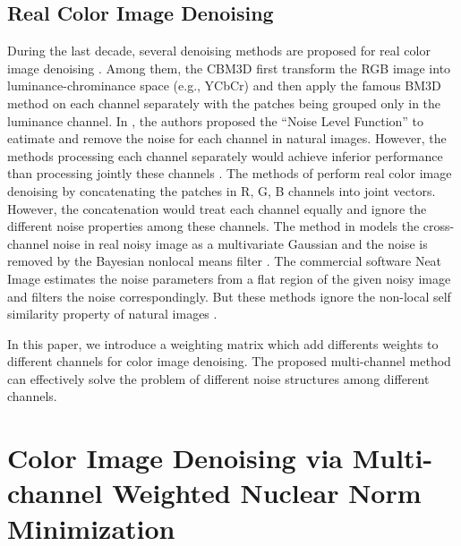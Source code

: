 \documentclass[10pt,twocolumn,letterpaper,sort&compress]{article}
\begin{document}
\subsection{Real Color Image Denoising}
During the last decade, several denoising methods are proposed for real color image denoising \cite{cbm3d,Liu2008,Zhu_2016_CVPR,noiseclinic}. Among them, the CBM3D \cite{cbm3d} first transform the RGB image into luminance-chrominance space (e.g., YCbCr) and then apply the famous BM3D method \cite{bm3d} on each channel separately with the patches being grouped only in the luminance channel. In \cite{Liu2008}, the authors proposed the ``Noise Level Function'' to eatimate and remove the noise for each channel in natural images. However, the methods processing each channel separately would achieve inferior performance than processing jointly these channels \cite{mairal2008sparse}. The methods of \cite{noiseclinic,ncwebsite,Zhu_2016_CVPR} perform real color image denoising by concatenating the patches in R, G, B channels into joint vectors. However, the concatenation would treat each channel equally and ignore the different noise properties among these channels. The method in \cite{crosschannel2016} models the cross-channel noise in real noisy image as a multivariate Gaussian and the noise is removed by the Bayesian nonlocal means filter \cite{kervrann2007bayesian}. The commercial software Neat Image \cite{neatimage} estimates the noise parameters from a flat region of the given noisy image and filters the noise correspondingly. But these methods \cite{crosschannel2016,neatimage} ignore the non-local self similarity property of natural images \cite{bm3d,wnnm}. 

In this paper, we introduce a weighting matrix which add differents weights to different channels for color image denoising. The proposed multi-channel method can effectively solve the problem of different noise structures among different channels.

\section{Color Image Denoising via Multi-channel Weighted Nuclear Norm Minimization}
\end{document}
